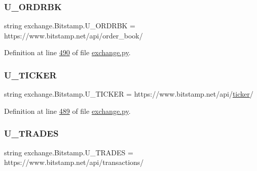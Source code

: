 \subsubsection{\texorpdfstring{U\+\_\+\+O\+R\+D\+R\+BK}{U\_ORDRBK}}
{\footnotesize\ttfamily string exchange.\+Bitstamp.\+U\+\_\+\+O\+R\+D\+R\+BK = \textquotesingle{}https\+://www.\+bitstamp.\+net/api/order\+\_\+book/\textquotesingle{}\hspace{0.3cm}{\ttfamily [static]}}



Definition at line \hyperlink{exchange_8py_source_l00490}{490} of file \hyperlink{exchange_8py_source}{exchange.\+py}.

\mbox{\label{classexchange_1_1_bitstamp_ad8453cd76be07bef0001b642e110f981}} 
\subsubsection{\texorpdfstring{U\+\_\+\+T\+I\+C\+K\+ER}{U\_TICKER}}
{\footnotesize\ttfamily string exchange.\+Bitstamp.\+U\+\_\+\+T\+I\+C\+K\+ER = \textquotesingle{}https\+://www.\+bitstamp.\+net/api/\hyperlink{classexchange_1_1_exchange_a7cf9e52f993627955a2e242c388daaeb}{ticker}/\textquotesingle{}\hspace{0.3cm}{\ttfamily [static]}}



Definition at line \hyperlink{exchange_8py_source_l00489}{489} of file \hyperlink{exchange_8py_source}{exchange.\+py}.

\mbox{\label{classexchange_1_1_bitstamp_a2424678b2c64d540ce9ecd0af2f96991}} 
\subsubsection{\texorpdfstring{U\+\_\+\+T\+R\+A\+D\+ES}{U\_TRADES}}
{\footnotesize\ttfamily string exchange.\+Bitstamp.\+U\+\_\+\+T\+R\+A\+D\+ES = \textquotesingle{}https\+://www.\+bitstamp.\+net/api/transactions/\textquotesingle{}\hspace{0.3cm}{\ttfamily [static]}}



